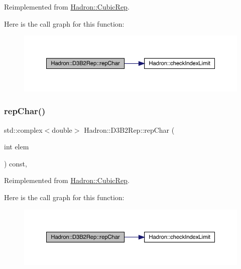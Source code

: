 Reimplemented from \mbox{\hyperlink{structHadron_1_1CubicRep_af45227106e8e715e84b0af69cd3b36f8}{Hadron\+::\+Cubic\+Rep}}.

Here is the call graph for this function\+:
\nopagebreak
\begin{figure}[H]
\begin{center}
\leavevmode
\includegraphics[width=350pt]{d3/d61/structHadron_1_1D3B2Rep_a905f3eda8837cdc95ef5c897f8ea4bd7_cgraph}
\end{center}
\end{figure}
\mbox{\label{structHadron_1_1D3B2Rep_a905f3eda8837cdc95ef5c897f8ea4bd7}} 
\subsubsection{\texorpdfstring{repChar()}{repChar()}\hspace{0.1cm}{\footnotesize\ttfamily [3/3]}}
{\footnotesize\ttfamily std\+::complex$<$double$>$ Hadron\+::\+D3\+B2\+Rep\+::rep\+Char (\begin{DoxyParamCaption}\item[{int}]{elem }\end{DoxyParamCaption}) const\hspace{0.3cm}{\ttfamily [inline]}, {\ttfamily [virtual]}}



Reimplemented from \mbox{\hyperlink{structHadron_1_1CubicRep_af45227106e8e715e84b0af69cd3b36f8}{Hadron\+::\+Cubic\+Rep}}.

Here is the call graph for this function\+:
\nopagebreak
\begin{figure}[H]
\begin{center}
\leavevmode
\includegraphics[width=350pt]{d3/d61/structHadron_1_1D3B2Rep_a905f3eda8837cdc95ef5c897f8ea4bd7_cgraph}
\end{center}
\end{figure}
\mbox{\label{structHadron_1_1D3B2Rep_a3e946b6e27ca026d8e7b1bcd02471deb}} 
